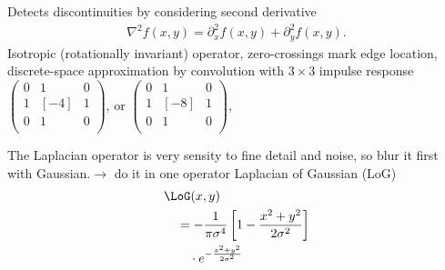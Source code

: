 \begin{compactdesc}
	\item[\lp{Laplacian operator}] Detects discontinuities by considering second derivative
		\begin{gather*}
			\nabla^2 f(x,y)=\partial_{x}^{2}f(x,y)+\partial_{y}^{2}f(x,y).
		\end{gather*}
		Isotropic (rotationally invariant) operator, zero-crossings mark edge location, discrete-space approximation by convolution with $3\times 3$ impulse response
		$\left(\begin{smallmatrix}
			0&1&0\\
			1&[-4]&1\\
			0&1&0\\
		\end{smallmatrix}\right)$, or
		$\left(\begin{smallmatrix}
			0&1&0\\
			1&[-8]&1\\
			0&1&0\\
		\end{smallmatrix}\right)$,
	\item[\lp{Laplacian of Gaussian}]
		The Laplacian operator is very sensity to fine detail and noise, so blur it first with Gaussian.$\to$ do it in one operator Laplacian of Gaussian (LoG)
		\begin{align*}
			&\LoG(x,y)\\
			&\quad=-\frac{1}{\pi\sigma^4}\left[ 1-\frac{x^2+y^2}{2\sigma^2} \right]\\
			&\qquad \cdot e^{-\frac{x^2+y^2}{2\sigma^2}}
		\end{align*}
\end{compactdesc}
